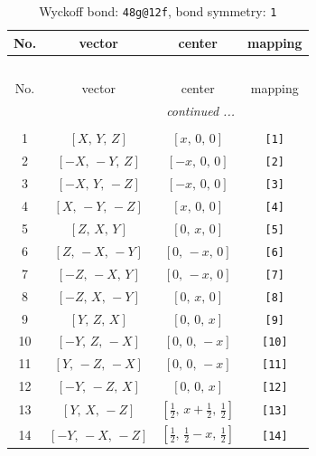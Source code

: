 \documentclass[fleqn,8pt]{jsarticle}
\begin{document}
\begin{longtable}{cccc}
\caption{Wyckoff bond: {\tt 48g@12f}, bond symmetry: {\tt 1}}
 \\
 \hline \hline
No. & vector & center & mapping \\ \hline \endfirsthead

\multicolumn{3}{l}{\tablename\ \thetable{}} \\
 \hline \hline
No. & vector & center & mapping \\ \hline \endhead

 \hline \hline
\multicolumn{3}{r}{\footnotesize\it continued ...} \\ \endfoot

 \hline \hline
\multicolumn{3}{r}{} \\ \endlastfoot

1 & $\left[ X,\, Y,\, Z \right]$ & $\left[ x,\, 0,\, 0 \right]$ & {\tt [1]} \\ \hline
2 & $\left[ - X,\, - Y,\, Z \right]$ & $\left[ - x,\, 0,\, 0 \right]$ & {\tt [2]} \\ \hline
3 & $\left[ - X,\, Y,\, - Z \right]$ & $\left[ - x,\, 0,\, 0 \right]$ & {\tt [3]} \\ \hline
4 & $\left[ X,\, - Y,\, - Z \right]$ & $\left[ x,\, 0,\, 0 \right]$ & {\tt [4]} \\ \hline
5 & $\left[ Z,\, X,\, Y \right]$ & $\left[ 0,\, x,\, 0 \right]$ & {\tt [5]} \\ \hline
6 & $\left[ Z,\, - X,\, - Y \right]$ & $\left[ 0,\, - x,\, 0 \right]$ & {\tt [6]} \\ \hline
7 & $\left[ - Z,\, - X,\, Y \right]$ & $\left[ 0,\, - x,\, 0 \right]$ & {\tt [7]} \\ \hline
8 & $\left[ - Z,\, X,\, - Y \right]$ & $\left[ 0,\, x,\, 0 \right]$ & {\tt [8]} \\ \hline
9 & $\left[ Y,\, Z,\, X \right]$ & $\left[ 0,\, 0,\, x \right]$ & {\tt [9]} \\ \hline
10 & $\left[ - Y,\, Z,\, - X \right]$ & $\left[ 0,\, 0,\, - x \right]$ & {\tt [10]} \\ \hline
11 & $\left[ Y,\, - Z,\, - X \right]$ & $\left[ 0,\, 0,\, - x \right]$ & {\tt [11]} \\ \hline
12 & $\left[ - Y,\, - Z,\, X \right]$ & $\left[ 0,\, 0,\, x \right]$ & {\tt [12]} \\ \hline
13 & $\left[ Y,\, X,\, - Z \right]$ & $\left[ \frac{1}{2},\, x + \frac{1}{2},\, \frac{1}{2} \right]$ & {\tt [13]} \\ \hline
14 & $\left[ - Y,\, - X,\, - Z \right]$ & $\left[ \frac{1}{2},\, \frac{1}{2} - x,\, \frac{1}{2} \right]$ & {\tt [14]} \\ \hline

\end{longtable}
\end{document}
